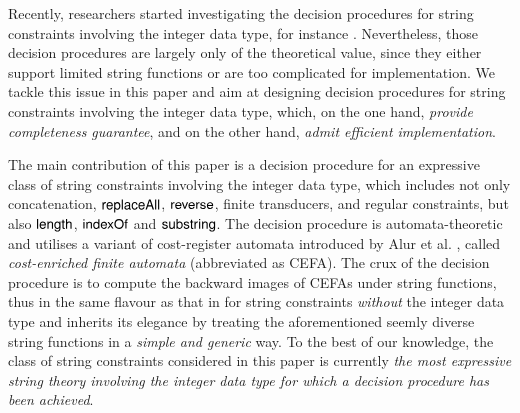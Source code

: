 
Recently, researchers started investigating the decision procedures for string constraints involving the integer data type, for instance \cite{Vijay-length,L16,LinM18,LB16}. Nevertheless, those decision procedures are largely only of the theoretical value, since they either support limited string functions or are too complicated for  implementation. 
We tackle this issue in this paper and aim at designing decision procedures for string constraints involving the integer data type, which, on the one hand, \emph{provide completeness guarantee}, and on the other hand, \emph{admit efficient implementation}.

The main contribution of this paper is a decision procedure for an expressive class of string constraints involving the integer data type, which includes not only concatenation, $\mathsf{replaceAll}$, $\mathsf{reverse}$, finite transducers, and regular constraints, but also $\mathsf{length}$, $\mathsf{indexOf}$ and $\mathsf{substring}$. The decision procedure is automata-theoretic and utilises a variant of cost-register automata introduced by Alur et al. \cite{RLJ+13}, called \emph{cost-enriched finite automata} (abbreviated as CEFA). The crux of the decision procedure is to compute the backward images of CEFAs under string functions, thus in the same flavour as that in \cite{CHL+19} for string constraints \emph{without} the integer data type and inherits its elegance by treating the aforementioned seemly diverse string functions in a \emph{simple and generic} way. To the best of our knowledge, the class of string constraints considered in this paper is currently \emph{the most expressive string theory involving the integer data type for which a decision procedure has been achieved}. 

